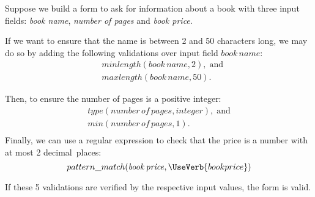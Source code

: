 \begin{example} \label{ex:book-validation}
\parindent0pt
Suppose we build a form to ask for information about a book with three input fields: \textit{book name}, \textit{number of pages} and \textit{book price}. 

If we want to ensure that the name is between 2 and 50 characters long, we may do so by adding the following validations over input field \(\mathit{book\,name}\):
\begin{equation*}
\begin{split}
    &minlength(\mathit{book\,name}, 2),\;\text{and}\\
    &maxlength(\mathit{book\,name}, 50).
\end{split}
\end{equation*}

Then, to ensure the number of pages is a positive integer:
\begin{equation*}
\begin{gathered}
    type(\mathit{number\,of\,pages}, integer),\;\text{and}\\
    min(\mathit{number\,of\,pages}, 1).\\
\end{gathered}
\end{equation*}
Finally, we can use a regular expression to check that the price is a number with at most 2 decimal~places:
\[pattern\_match(\mathit{book\,price}, \UseVerb{bookprice})\]

If these 5 validations are verified by the respective input values, the form is valid.
\end{example}
